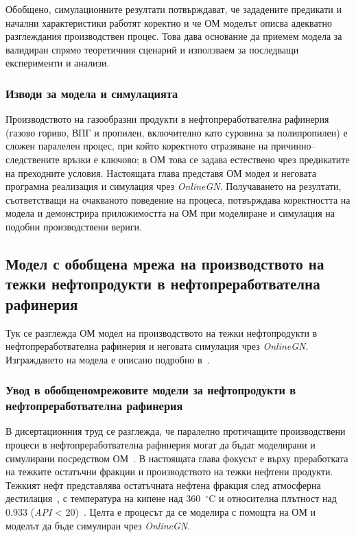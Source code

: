 Обобщено, симулационните резултати потвърждават, че зададените предикати и начални характеристики работят коректно и че ОМ моделът описва адекватно разглеждания производствен процес. Това дава основание да приемем модела за валидиран спрямо теоретичния сценарий и използваем за последващи експерименти и анализи.

\subsubsection{Изводи за модела и симулацията}

\hspace*{2.5em}Производството на газообразни продукти в нефтопреработвателна рафинерия (газово гориво, ВПГ и пропилен, включително като суровина за полипропилен) е сложен паралелен процес, при който коректното отразяване на причинно--следствените връзки е ключово; в ОМ това се задава естествено чрез предикатите на преходните условия. Настоящата глава представя ОМ модел и неговата програмна реализация и симулация чрез \textit{OnlineGN}. Получаването на резултати, съответстващи на очакваното поведение на процеса, потвърждава коректността на модела и демонстрира приложимостта на ОМ при моделиране и симулация на подобни производствени вериги.

\subsection{Модел с обобщена мрежа на производството на тежки нефтопродукти в нефтопреработвателна рафинерия}

\hspace*{2.5em}Тук се разглежда ОМ модел на производството на тежки нефтопродукти в нефтопреработвателна рафинерия и неговата симулация чрез \textit{OnlineGN}. Изграждането на модела е описано подробно в~\cite{DIS-Stratiev2023_2}.

\subsubsection{Увод в обобщеномрежовите модели за нефтопродукти в нефтопреработвателна рафинерия}

\hspace*{2.5em}В дисертационния труд се разглежда, че паралелно протичащите производствени процеси в нефтопреработвателна рафинерия могат да бъдат моделирани и симулирани посредством ОМ~\cite{DIS-Z1}. В настоящата глава фокусът е върху преработката на тежките остатъчни фракции и производството на тежки нефтени продукти. Тежкият нефт представлява остатъчната нефтена фракция след атмосферна дестилация~\cite{DIS-96}, с температура на кипене над 360~$^\circ$C и относителна плътност над 0.933 (\textit{API} < 20)~\cite{DIS-97}. Целта е процесът да се моделира с помощта на ОМ и моделът да бъде симулиран чрез \textit{OnlineGN}.

